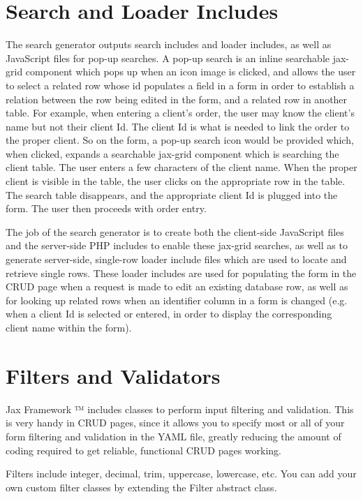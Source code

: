 \documentclass[letterpaper,10pt,english]{sphinxmanual}
\begin{document}
\section{Search and Loader Includes}
\label{jaxFrameworkGuide:search-and-loader-includes}
The search generator outputs search includes and loader includes, as well as JavaScript files for
pop-up searches.  A pop-up search is an inline searchable jax-grid component which pops up when an
icon image is clicked, and allows the user to select a related row whose id populates a field in a
form in order to establish a relation between the row being edited in the form, and a related row in
another table.  For example, when entering a client's order, the user may know the client's name but
not their client Id.  The client Id is what is needed to link the order to the proper client. So on
the form, a pop-up search icon would be provided which, when clicked, expands a searchable
jax-grid component which is searching the client table.  The user enters a few characters of the
client name. When the proper client is visible in the table, the user clicks on the appropriate row
in the table.  The search table disappears, and the appropriate client Id is plugged into the form.
The user then proceeds with order entry.

The job of the search generator is to create both the client-side JavaScript files and the
server-side PHP includes to enable these jax-grid searches, as well as to generate
server-side, single-row loader include files which are used to locate and retrieve single rows.
These loader includes are used for populating the form in the CRUD page when a request is made to
edit an existing database row, as well as for looking up related rows when an identifier column in a
form is changed (e.g. when a client Id is selected or entered, in order to display the corresponding
client name within the form).


\section{Filters and Validators}
\label{jaxFrameworkGuide:filters-and-validators}
Jax Framework ™ includes classes to perform input filtering and validation.  This is very
handy in CRUD pages, since it allows you to specify most or all of your form filtering and
validation in the YAML file, greatly reducing the amount of coding required to get reliable,
functional CRUD pages working.

Filters include integer, decimal, trim, uppercase, lowercase, etc.  You can add your own custom
filter classes by extending the Filter abstract class.
\end{document}
